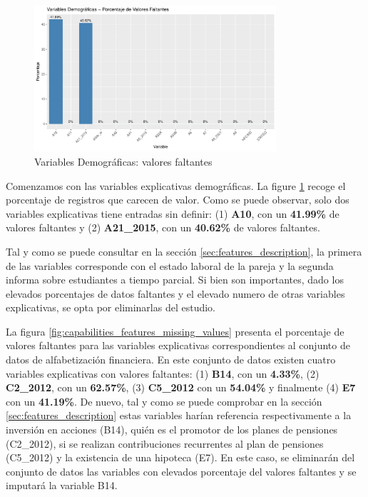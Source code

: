 \documentclass[a4paper, 11pt]{article}
\begin{document}
\begin{figure}[ht]
    \centering
    \includegraphics[width=0.8\textwidth]{images/Demographic_Features__Missing_Values.pdf} 
    \caption{Variables Demográficas: valores faltantes}
    \label{fig:demographic_features_missing_values}
\end{figure}

Comenzamos con las variables explicativas demográficas. La figure \ref{fig:demographic_features_missing_values}
recoge el porcentaje de registros que carecen de valor. Como se puede observar, solo dos 
variables explicativas tiene entradas sin definir: (1) \textbf{A10}, con un
\textbf{41.99\%} de valores faltantes y (2) \textbf{A21\_2015}, con un \textbf{40.62\%} de 
valores faltantes. 

Tal y como se puede consultar en la sección \ref{sec:features_description}, la 
primera de las variables corresponde con el estado laboral de la pareja y la segunda informa 
sobre estudiantes a tiempo parcial. Si bien son importantes, dado los elevados porcentajes de
datos faltantes y el elevado numero de otras variables explicativas, se opta por eliminarlas
del estudio.

La figura \ref{fig:capabilities_features_missing_values} presenta el porcentaje de valores 
faltantes para las variables explicativas correspondientes al conjunto de datos de alfabetización
financiera. En este conjunto de datos existen cuatro variables explicativas con valores faltantes:
(1) \textbf{B14}, con un \textbf{4.33\%}, (2) \textbf{C2\_2012}, con un \textbf{62.57\%}, (3) 
\textbf{C5\_2012} con un \textbf{54.04\%} y finalmente (4) \textbf{E7} con un \textbf{41.19\%}. De
nuevo, tal y como se puede comprobar en la sección \ref{sec:features_description} estas variables harían
referencia respectivamente a la inversión en acciones (B14), quién es el promotor de los planes de
pensiones (C2\_2012), si se realizan contribuciones recurrentes al plan de pensiones (C5\_2012) y
la existencia de una hipoteca (E7). En este caso, se eliminarán del conjunto de datos las
variables con elevados porcentaje del valores faltantes y se imputará la variable B14.
\end{document}

